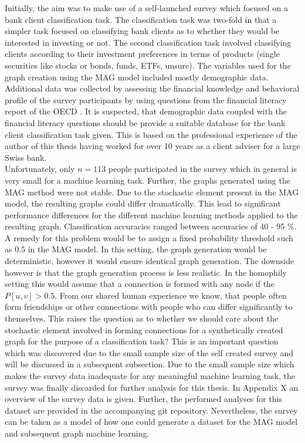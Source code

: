   Initially, the aim was to make use of a self-launched survey which focused on
  a bank client classification task. The classification task was two-fold in 
  that a simpler task focused on classifying bank clients as to whether they 
  would be interested in investing or not. The second classification task
  involved classifying clients according to their investment preferences in
  terms of products (single securities like stocks or bonds, funds, ETFs,
  unsure). The variables used for the graph creation using the MAG model
  included mostly demographic data. Additional data was collected by assessing
  the financial knowledge and behavioral profile of the survey participants by 
  using questions from the financial literacy report of the OECD \citep{OECD2017}.
  It is suspected, that demographic data coupled with the financial literacy
  questions should be provide a suitable database for the bank client
  classification task given. This is based on the professional experience of
  the author of this thesis having worked for over 10 years as a client adviser
  for a large Swiss bank. \\

  \noindent Unfortunately, only $n=113$ people participated in the survey which 
  in general is very small for a machine learning task.
  Further, the graphs generated using the MAG method were not stable. Due to
  the stochastic element present in the MAG model, the resulting graphs could
  differ dramatically. This lead to significant performance differences for the
  different machine learning methods applied to the resulting graph.
  Classification accuracies ranged between accuracies of 40 - 95 \%. A remedy
  for this problem would be to assign a fixed probability threshold such as 0.5
  in the MAG model. In this setting, the graph generation would be
  deterministic, however it would ensure identical graph generation. The
  downside however is that the graph generation process is less realistic. In
  the homophily setting this would assume that a connection is formed with any
  node if the $P[u,v]>0.5$. From our shared human experience we know, that
  people often form friendships or other connections with people who can differ
  significantly to themselves. This raises the question as to whether we should
  care about the stochastic element involved in forming connections for a
  synthetically created graph for the purpose of a classification task? This is
  an important question which was discovered due to the small sample size of
  the self created survey and will be discussed in a subsequent subsection. 
  Due to the small sample size which makes the survey data inadequate for any
  meaningful machine learning task, the survey was finally discarded for
  further analysis for this thesis. In Appendix X an overview of the survey
  data is given. Further, the performed analyses for this dataset are provided
  in the accompanying git repository. Nevertheless, the survey can be taken as
  a model of how one could generate a dataset for the MAG model and subsequent
  graph machine learning. 



